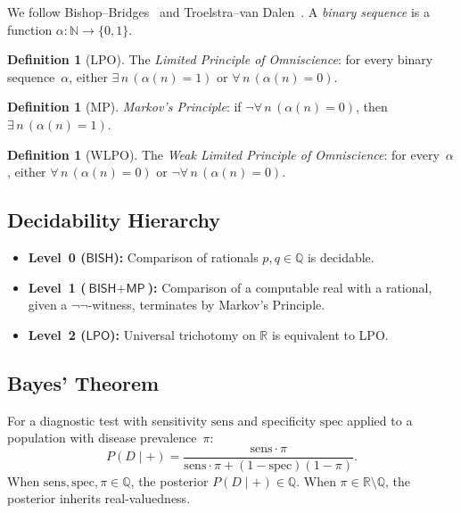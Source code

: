 \documentclass[11pt,a4paper]{article}
\theoremstyle{plain}
\theoremstyle{definition}
\newtheorem{definition}[theorem]{Definition}
\newcommand{\BISH}{\textsf{BISH}}
\newcommand{\LPO}{\textsf{LPO}}
\newcommand{\MP}{\textsf{MP}}
\newcommand{\Q}{\mathbb{Q}}
\newcommand{\R}{\mathbb{R}}
\newcommand{\N}{\mathbb{N}}
\begin{document}
We follow Bishop--Bridges~\cite{bishop-bridges} and Troelstra--van Dalen~\cite{troelstra-vandalen}.  A \emph{binary sequence} is a function $\alpha : \N \to \{0,1\}$.

\begin{definition}[LPO]
The \emph{Limited Principle of Omniscience}: for every binary sequence~$\alpha$, either $\exists\, n\,(\alpha(n)=1)$ or $\forall\, n\,(\alpha(n)=0)$.
\end{definition}

\begin{definition}[MP]
\emph{Markov's Principle}: if $\lnot\forall\, n\,(\alpha(n)=0)$, then $\exists\, n\,(\alpha(n)=1)$.
\end{definition}

\begin{definition}[WLPO]
The \emph{Weak Limited Principle of Omniscience}: for every~$\alpha$, either $\forall\, n\,(\alpha(n)=0)$ or $\lnot\forall\, n\,(\alpha(n)=0)$.
\end{definition}

\subsection{Decidability Hierarchy}

\begin{itemize}[nosep]
\item \textbf{Level~0 ($\BISH$):} Comparison of rationals $p, q \in \Q$ is decidable.
\item \textbf{Level~1 ($\BISH + \MP$):} Comparison of a computable real with a rational, given a $\lnot\lnot$-witness, terminates by Markov's Principle.
\item \textbf{Level~2 ($\LPO$):} Universal trichotomy on $\R$ is equivalent to LPO.
\end{itemize}

\subsection{Bayes' Theorem}

For a diagnostic test with sensitivity $\mathrm{sens}$ and specificity $\mathrm{spec}$ applied to a population with disease prevalence~$\pi$:
\begin{equation}\label{eq:bayes}
  P(D \mid +) = \frac{\mathrm{sens} \cdot \pi}{\mathrm{sens} \cdot \pi + (1 - \mathrm{spec})(1 - \pi)}.
\end{equation}
When $\mathrm{sens}, \mathrm{spec}, \pi \in \Q$, the posterior $P(D\mid +) \in \Q$.  When $\pi \in \R \setminus \Q$, the posterior inherits real-valuedness.
\end{document}
